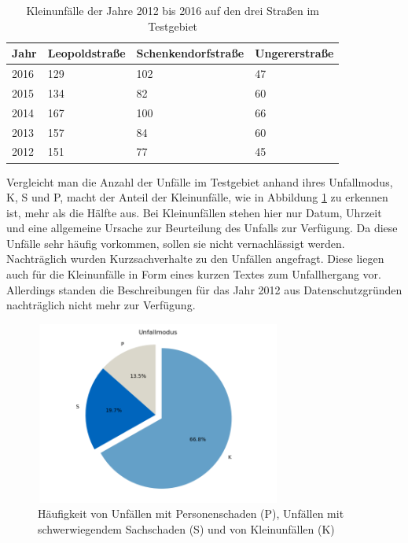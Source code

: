 \begin{table}[htpb]
	\scriptsize
	\caption[Kleinunfälle der Jahre 2012 bis 2016 auf den drei Straßen im Testgebiet]{Kleinunfälle der Jahre 2012 bis 2016 auf den drei Straßen im Testgebiet}\label{tab:Kleinunfälle}
	\centering
	\begin{tabular}{l  l l p{2cm}}
		\toprule
		Jahr & Leopoldstraße & Schenkendorfstraße & Ungererstraße \\
		\midrule
		2016 & 129 & 102 & 47\\
		2015 & 134 & 82 & 60\\
		2014 & 167 & 100 & 66\\
		2013 & 157 & 84 & 60\\
		2012 & 151 & 77 & 45\\
		\bottomrule
	\end{tabular}
\end{table}

Vergleicht man die Anzahl der Unfälle im Testgebiet anhand ihres Unfallmodus, \acf{K}, \acf{S} und \acf{P}, macht der Anteil der Kleinunfälle, wie in Abbildung \ref{fig:Unfallmodus} zu erkennen ist, mehr als die Hälfte aus. Bei Kleinunfällen stehen hier nur Datum, Uhrzeit und eine allgemeine Ursache zur Beurteilung des Unfalls zur Verfügung. Da diese Unfälle sehr häufig vorkommen, sollen sie nicht vernachlässigt werden. Nachträglich wurden Kurzsachverhalte zu den Unfällen angefragt. Diese liegen auch für die Kleinunfälle in  Form eines kurzen Textes zum Unfallhergang vor. Allerdings standen die Beschreibungen für das Jahr 2012 aus Datenschutzgründen nachträglich nicht mehr zur Verfügung.

\begin{savenotes}
	\begin{figure}[H]
		\centering
		\includegraphics[width=8.1cm,height=6cm]{figures/Unfallmodus}
		\caption[Häufigkeit des Unfallmodus]{Häufigkeit von Unfällen mit Personenschaden (P), Unfällen mit schwerwiegendem Sachschaden (S) und von Kleinunfällen (K)}\label{fig:Unfallmodus}
	\end{figure}
\end{savenotes}

